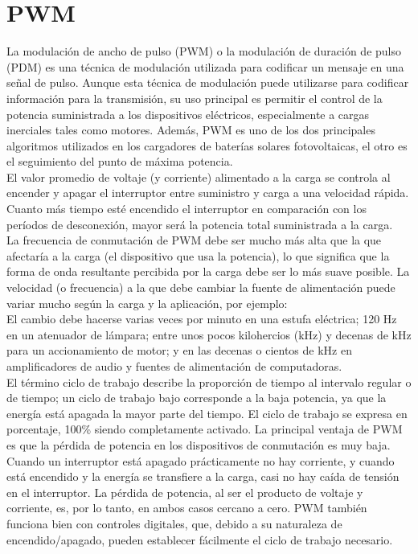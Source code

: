 \section{PWM}

La modulación de ancho de pulso (PWM) o la modulación de duración de pulso (PDM) es una técnica de modulación utilizada para codificar un mensaje en una señal de pulso. 
Aunque esta técnica de modulación puede utilizarse para codificar información para la transmisión, su uso principal es permitir el control de la potencia suministrada a los
dispositivos eléctricos, especialmente a cargas inerciales tales como motores. Además, PWM es uno de los dos principales algoritmos utilizados en los cargadores de baterías solares
fotovoltaicas, el otro es el seguimiento del punto de máxima potencia.\\

El valor promedio de voltaje (y corriente) alimentado a la carga se controla al encender y apagar el interruptor entre suministro y carga a una velocidad rápida. Cuanto más tiempo
esté encendido el interruptor en comparación con los períodos de desconexión, mayor será la potencia total suministrada a la carga.\\

La frecuencia de conmutación de PWM debe ser mucho más alta que la que afectaría a la carga (el dispositivo que usa la potencia), lo que significa que la forma de onda resultante
percibida por la carga debe ser lo más suave posible. La velocidad (o frecuencia) a la que debe cambiar la fuente de alimentación puede variar mucho según la carga y la aplicación,
por ejemplo:\\

El cambio debe hacerse varias veces por minuto en una estufa eléctrica; 120 Hz en un atenuador de lámpara; entre unos pocos kilohercios (kHz) y decenas de kHz para un accionamiento
de motor; y en las decenas o cientos de kHz en amplificadores de audio y fuentes de alimentación de computadoras.\\


El término ciclo de trabajo describe la proporción de tiempo  al intervalo regular o  de tiempo; un ciclo de trabajo bajo corresponde a la baja potencia,
ya que la energía está apagada la mayor parte del tiempo. El ciclo de trabajo se expresa en porcentaje, 100\% siendo completamente activado.
La principal ventaja de PWM es que la pérdida de potencia en los dispositivos de conmutación es muy baja. Cuando un interruptor está apagado prácticamente no hay corriente, y 
cuando está encendido y la energía se transfiere a la carga, casi no hay caída de tensión en el interruptor. La pérdida de potencia, al ser el producto de voltaje y corriente, es,
por lo tanto, en ambos casos cercano a cero. PWM también funciona bien con controles digitales, que, debido a su naturaleza de encendido/apagado, pueden establecer fácilmente el 
ciclo de trabajo necesario.\\
